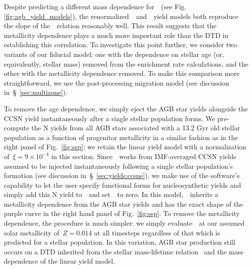 \documentclass[ms.tex]{subfiles}
\begin{document}
Despite predicting a different mass dependence for~~(see Fig.
\ref{fig:agb_yield_models}), the renormalized~\cristallo~and~\ventura~yield
models both reproduce the slope of the~\ohno~relation reasonably well.
This result suggests that the metallicity dependence plays a much more
important role than the DTD in establishing this correlation.
To investigate this point further, we consider two variants of our fiducial
model: one with the dependence on stellar age (or, equivalently, stellar mass)
removed from the enrichment rate calculations, and the other with the
metallicity dependence removed.
To make this comparison more straightforward, we use the post-processing
migration model (see discussion in~\S~\ref{sec:multizone}).
\par
To remove the age dependence, we simply eject the AGB star yields alongside
the CCSN yield instantaneously after a single stellar population forms.
We pre-compute the N yields from all AGB stars associated with a 13.2 Gyr old
stellar population as a function of progenitor metallicity in a similar fashion
as in the right panel of Fig.~\ref{fig:ssp}; we retain the linear yield model
with a normalization of~$\xi = 9\times10^{-4}$ in this section.
Since~\vice~works from IMF-averaged CCSN yields assumed to be injected
instantaneously following a single stellar population's formation (see
discussion in~\S~\ref{sec:yields:ccsne}), we make use of the software's
capability to let the user specify functional forms for nucleosynthetic yields
and simply add this N yield to~~and set~~to zero.
In this model,~~inherits a metallicity dependence from the AGB star
yields and has the exact shape of the purple curve in the right hand panel of
Fig.~\ref{fig:ssp}.
To remove the metallicity dependence, the procedure is much simpler: we simply
evaluate~~at our assumed solar metallicity of~$Z = 0.014$ at all
timesteps regardless of that which is predicted for a stellar population.
In this variation, AGB star production still occurs on a DTD inherited from
the stellar mass-lifetime relation~\citep{Larson1974} and the mass dependence
of the linear yield model.
\end{document}
